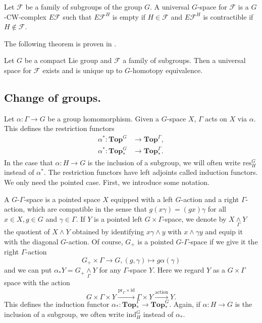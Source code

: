 \begin{mydef}
Let $\mathcal{F}$ be a family of subgroups of the group $G$. A universal $G$-space
for $\mathcal{F}$ is a $G$-CW-complex $E\mathcal{F}$ such that $E\mathcal{F}^H$
is empty if $H\in \mathcal{F}$ and $E\mathcal{F}^H$
is contractible if $H\not \in \mathcal{F}$.
\end{mydef}
The following theorem is proven in \cite[Section~I.6]{diecktg}.
\begin{thm}
Let $G$ be a compact Lie group and $\mathcal{F}$ a family of subgroups.
Then a universal space for $\mathcal{F}$ exists and is unique up to
$G$-homotopy equivalence.
\end{thm}

\subsection{Change of groups.}
Let $\alpha:\Gamma\to G$ be a group homomorphism. Given a $G$-space
$X$, $\Gamma$ acts on $X$ via $\alpha$. This defines the restriction
functors 
\begin{align*}
\alpha^\ast : \mathbf{Top}^G&\to \mathbf{Top}^\Gamma,\\
\alpha^\ast : \mathbf{Top}^G_\ast&\to \mathbf{Top}^{\Gamma}_\ast.
\end{align*}
In the case that $\alpha:H\to G$ is the inclusion of a subgroup,
we will often write $\mathrm{res}^G_H\,$ instead of $\alpha^\ast$.
The restriction functors have left adjoints called induction functors.
We only need the pointed case. First, we introduce some notation.

A $G$-$\Gamma$-space is a pointed space $X$ equipped with
a left $G$-action and a right $\Gamma$-action, which
are compatible in the sense that $g(x\gamma) = (gx)\gamma$
for all $x\in X, g\in G$ and $\gamma\in \Gamma$. If $Y$ is a pointed
left $G\times \Gamma$-space,
we denote by $X\underset{\Gamma}{\wedge} Y$
the quotient of $X\wedge Y$ obtained by identifying
$x\gamma \wedge y$ with $x\wedge \gamma y$ and equip it
with the diagonal $G$-action.
Of course,  $G_+$ is a pointed $G$-$\Gamma$-space if we give it
the right $\Gamma$-action
\[
G_+\times \Gamma\to G, (g,\gamma)\mapsto g\alpha(\gamma)
\]
and we can put $\alpha_\ast Y = G_+\underset{\Gamma}{\wedge} Y$
for any $\Gamma$-space $Y$. Here we regard $Y$
as a $G\times \Gamma$ space with the action
\[
G\times \Gamma\times Y\xrightarrow{\mathrm{pr}_\Gamma\times \mathrm{id}}
\Gamma\times Y\xrightarrow{\mathrm{action}} Y.
\]This defines the induction
functor $\alpha_\ast:\mathbf{Top}^\Gamma_\ast\to 
\mathbf{Top}_\ast^G$. Again, if
$\alpha:H\to G$ is the inclusion of a subgroup, we
often write $\mathrm{ind}^G_H$ instead of $\alpha_\ast$.

